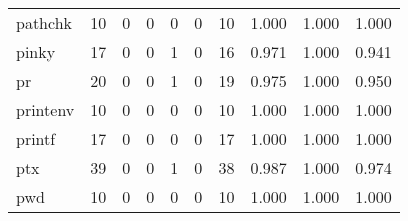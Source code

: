 \begin{longtable}{lp{1.3cm}p{1.3cm}p{1.3cm}p{1.3cm}p{1.3cm}p{1.3cm}p{1.3cm}p{1.3cm}p{1.3cm}}
pathchk   &                     10 &                                             0 &                                            0 &                                           0 &                                            0 &                                         10 &                                1.000 &                                  1.000 &                                1.000 \\
pinky     &                     17 &                                             0 &                                            0 &                                           1 &                                            0 &                                         16 &                                0.971 &                                  1.000 &                                0.941 \\
pr        &                     20 &                                             0 &                                            0 &                                           1 &                                            0 &                                         19 &                                0.975 &                                  1.000 &                                0.950 \\
printenv  &                     10 &                                             0 &                                            0 &                                           0 &                                            0 &                                         10 &                                1.000 &                                  1.000 &                                1.000 \\
printf    &                     17 &                                             0 &                                            0 &                                           0 &                                            0 &                                         17 &                                1.000 &                                  1.000 &                                1.000 \\
ptx       &                     39 &                                             0 &                                            0 &                                           1 &                                            0 &                                         38 &                                0.987 &                                  1.000 &                                0.974 \\
pwd       &                     10 &                                             0 &                                            0 &                                           0 &                                            0 &                                         10 &                                1.000 &                                  1.000 &                                1.000 \\

\end{longtable}
